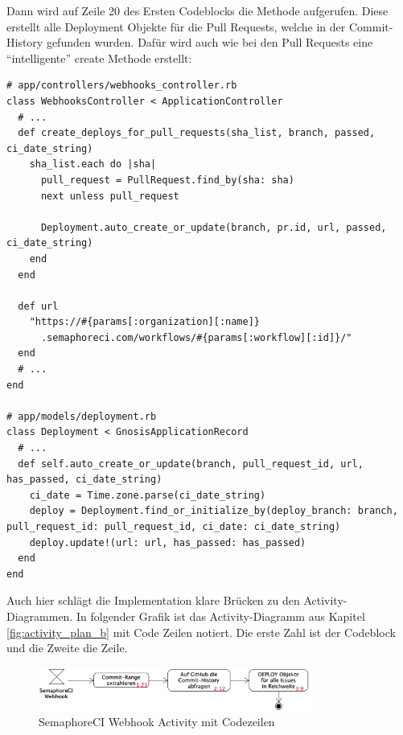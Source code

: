 Dann wird auf Zeile 20 des Ersten Codeblocks die Methode 
aufgerufen. Diese erstellt alle Deployment Objekte für die Pull Requests, welche in der Commit-History gefunden wurden.
Dafür wird auch wie bei den Pull Requests eine \enquote{intelligente} create Methode erstellt:
\begin{codebox}[]
  \begin{verbatim}
# app/controllers/webhooks_controller.rb
class WebhooksController < ApplicationController
  # ...
  def create_deploys_for_pull_requests(sha_list, branch, passed, ci_date_string)
    sha_list.each do |sha|
      pull_request = PullRequest.find_by(sha: sha)
      next unless pull_request

      Deployment.auto_create_or_update(branch, pr.id, url, passed, ci_date_string)
    end
  end

  def url
    "https://#{params[:organization][:name]}
      .semaphoreci.com/workflows/#{params[:workflow][:id]}/"
  end
  # ...
end

# app/models/deployment.rb
class Deployment < GnosisApplicationRecord
  # ...
  def self.auto_create_or_update(branch, pull_request_id, url, has_passed, ci_date_string)
    ci_date = Time.zone.parse(ci_date_string)
    deploy = Deployment.find_or_initialize_by(deploy_branch: branch, pull_request_id: pull_request_id, ci_date: ci_date_string)
    deploy.update!(url: url, has_passed: has_passed)
  end
end
  \end{verbatim}
\end{codebox}
Auch hier schlägt die Implementation klare Brücken zu den Activity-Diagrammen. In folgender Grafik ist das
Activity-Diagramm aus Kapitel \ref{fig:activity_plan_b} mit Code Zeilen notiert. Die erste Zahl ist der Codeblock und
die Zweite die Zeile.
\begin{figure}[H]
  \centering
  \includegraphics[width=0.8\textwidth]{images/activity/plan_b_code.png}
  \caption[Activity Diagramm zu SemaphoreCI Webhook Daten mit Codezeilen]{SemaphoreCI Webhook Activity mit Codezeilen}
  \label{fig:activity_plan_b_code}
\end{figure}

